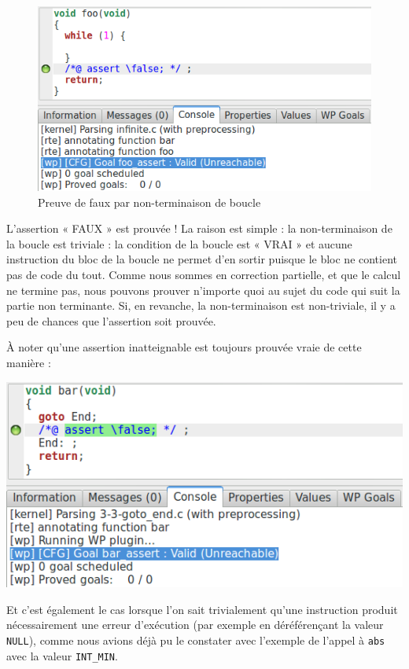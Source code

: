 \documentclass[12pt,francais,]{scrbook}
\newenvironment{zdsblock}[1]{%
  \tcolorbox[beamer,%
    noparskip,breakable,
    colback=LightBlue,colframe=DarkBlue,%
    colbacklower=DarkBlue,%
    title=#1]
}{\endtcolorbox}
\begin{document}
\begin{figure}[htbp]
\centering
\includegraphics[scale=0.5]{3-3-infinite.png}
\caption{Preuve de faux par non-terminaison de boucle}
\label{fig:3-3-infini}
\end{figure}

L'assertion « FAUX » est prouvée ! La raison est simple : la
non-terminaison de la boucle est triviale : la condition de la boucle
est « VRAI » et aucune instruction du bloc de la boucle ne permet d'en
sortir puisque le bloc ne contient pas de code du tout. Comme nous
sommes en correction partielle, et que le calcul ne termine pas, nous
pouvons prouver n'importe quoi au sujet du code qui suit la partie non
terminante. Si, en revanche, la non-terminaison est non-triviale, il y a
peu de chances que l'assertion soit prouvée.

\begin{zdsblock}{Information}
  À noter qu'une assertion
  inatteignable est toujours prouvée vraie de cette manière :
  \begin{center}
  \includegraphics[scale=0.5]{3-3-goto_end.png}
  \end{center}
  
  Et c'est également le cas lorsque l'on sait
  trivialement qu'une instruction produit nécessairement une
  erreur d'exécution (par exemple en déréférençant la valeur
  \texttt{NULL}), comme nous avions déjà pu le constater avec l'exemple
  de l'appel à \texttt{abs} avec la valeur \texttt{INT\_MIN}.
\end{zdsblock}
\end{document}
